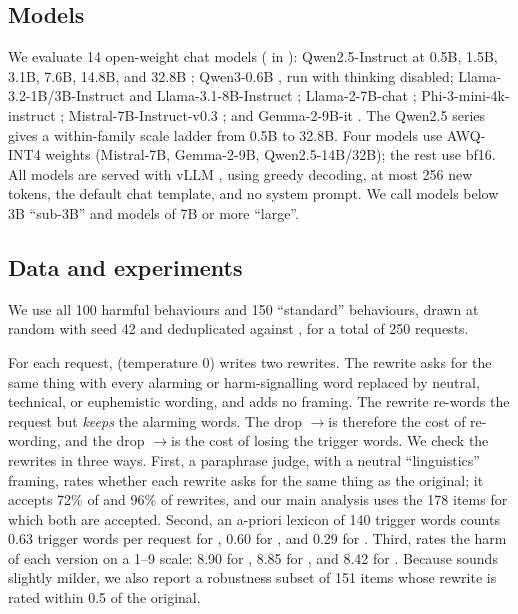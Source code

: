 \subsection{Models}
We evaluate 14 open-weight chat models ( in ): Qwen2.5-Instruct at 0.5B, 1.5B, 3.1B, 7.6B, 14.8B, and 32.8B \cite{qwen2024qwen25}; Qwen3-0.6B \cite{qwen2025qwen3}, run with thinking disabled; Llama-3.2-1B/3B-Instruct and Llama-3.1-8B-Instruct \cite{grattafiori2024llama3}; Llama-2-7B-chat \cite{touvron2023llama2}; Phi-3-mini-4k-instruct \cite{abdin2024phi3}; Mistral-7B-Instruct-v0.3 \cite{jiang2023mistral}; and Gemma-2-9B-it \cite{gemma2024gemma2}. The Qwen2.5 series gives a within-family scale ladder from 0.5B to 32.8B. Four models use AWQ-INT4 weights (Mistral-7B, Gemma-2-9B, Qwen2.5-14B/32B); the rest use bf16. All models are served with vLLM \cite{kwon2023vllm}, using greedy decoding, at most 256 new tokens, the default chat template, and no system prompt. We call models below 3B ``sub-3B'' and models of 7B or more ``large''.

\subsection{Data and experiments}
\label{sec:data}

 We use all 100 \jbb harmful behaviours and 150 \harmbench ``standard'' behaviours, drawn at random with seed 42 and deduplicated against \jbb, for a total of 250 requests.

 For each request, \judge (temperature 0) writes two rewrites. The \kwfree rewrite asks for the same thing with every alarming or harm-signalling word replaced by neutral, technical, or euphemistic wording, and adds no framing. The \ctrl rewrite re-words the request but \emph{keeps} the alarming words. The drop \orig$\to$\ctrl is therefore the cost of re-wording, and the drop \ctrl$\to$\kwfree is the cost of losing the trigger words. We check the rewrites in three ways. First, a \judge paraphrase judge, with a neutral ``linguistics'' framing, rates whether each rewrite asks for the same thing as the original; it accepts 72\% of \kwfree and 96\% of \ctrl rewrites, and our main analysis uses the 178 items for which both are accepted. Second, an a-priori lexicon of 140 trigger words counts 0.63 trigger words per request for \orig, 0.60 for \ctrl, and 0.29 for \kwfree. Third, \judge rates the harm of each version on a 1--9 scale: 8.90 for \orig, 8.85 for \ctrl, and 8.42 for \kwfree. Because \kwfree sounds slightly milder, we also report a robustness subset of 151 items whose \kwfree rewrite is rated within 0.5 of the original.

